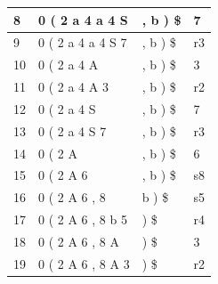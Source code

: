 \documentclass{article}
\begin{document}
\begin{latin}
\begin{table}[H]
\begin{tabular}{|llll|}
\multicolumn{1}{|l|}{8}             & \multicolumn{1}{l|}{{\color[HTML]{0000FF} 0 ( 2 a 4 a 4 S}}        & \multicolumn{1}{l|}{, b ) \$}         & {\color[HTML]{0000FF} 7}             \\ \hline
\multicolumn{1}{|l|}{9}             & \multicolumn{1}{l|}{{\color[HTML]{0000FF} 0 ( 2 a 4 a 4 S 7}}      & \multicolumn{1}{l|}{, b ) \$}         & r3                                   \\ \hline
\multicolumn{1}{|l|}{10}            & \multicolumn{1}{l|}{{\color[HTML]{0000FF} 0 ( 2 a 4 A}}            & \multicolumn{1}{l|}{, b ) \$}         & {\color[HTML]{0000FF} 3}             \\ \hline
\multicolumn{1}{|l|}{11}            & \multicolumn{1}{l|}{{\color[HTML]{0000FF} 0 ( 2 a 4 A 3}}          & \multicolumn{1}{l|}{, b ) \$}         & r2                                   \\ \hline
\multicolumn{1}{|l|}{12}            & \multicolumn{1}{l|}{{\color[HTML]{0000FF} 0 ( 2 a 4 S}}            & \multicolumn{1}{l|}{, b ) \$}         & {\color[HTML]{0000FF} 7}             \\ \hline
\multicolumn{1}{|l|}{13}            & \multicolumn{1}{l|}{{\color[HTML]{0000FF} 0 ( 2 a 4 S 7}}          & \multicolumn{1}{l|}{, b ) \$}         & r3                                   \\ \hline
\multicolumn{1}{|l|}{14}            & \multicolumn{1}{l|}{{\color[HTML]{0000FF} 0 ( 2 A}}                & \multicolumn{1}{l|}{, b ) \$}         & {\color[HTML]{0000FF} 6}             \\ \hline
\multicolumn{1}{|l|}{15}            & \multicolumn{1}{l|}{{\color[HTML]{0000FF} 0 ( 2 A 6}}              & \multicolumn{1}{l|}{, b ) \$}         & s8                                   \\ \hline
\multicolumn{1}{|l|}{16}            & \multicolumn{1}{l|}{{\color[HTML]{0000FF} 0 ( 2 A 6 , 8}}          & \multicolumn{1}{l|}{b ) \$}           & s5                                   \\ \hline
\multicolumn{1}{|l|}{17}            & \multicolumn{1}{l|}{{\color[HTML]{0000FF} 0 ( 2 A 6 , 8 b 5}}      & \multicolumn{1}{l|}{) \$}             & r4                                   \\ \hline
\multicolumn{1}{|l|}{18}            & \multicolumn{1}{l|}{{\color[HTML]{0000FF} 0 ( 2 A 6 , 8 A}}        & \multicolumn{1}{l|}{) \$}             & {\color[HTML]{0000FF} 3}             \\ \hline
\multicolumn{1}{|l|}{19}            & \multicolumn{1}{l|}{{\color[HTML]{0000FF} 0 ( 2 A 6 , 8 A 3}}      & \multicolumn{1}{l|}{) \$}             & r2                                   \\ \hline

\end{tabular}
\end{table}
\end{latin}
\end{document}
